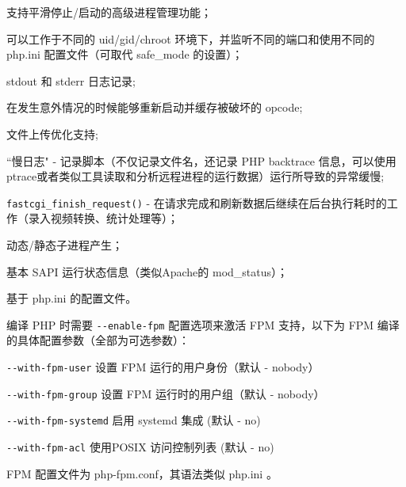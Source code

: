 \begin{compactitem}
\item 支持平滑停止/启动的高级进程管理功能；

\item 可以工作于不同的 uid/gid/chroot 环境下，并监听不同的端口和使用不同的 php.ini 配置文件（可取代 safe\_mode 的设置）；

\item stdout 和 stderr 日志记录;

\item 在发生意外情况的时候能够重新启动并缓存被破坏的 opcode;

\item 文件上传优化支持;

\item ``慢日志" - 记录脚本（不仅记录文件名，还记录 PHP backtrace 信息，可以使用 ptrace或者类似工具读取和分析远程进程的运行数据）运行所导致的异常缓慢;

\item \texttt{fastcgi\_finish\_request()} - 在请求完成和刷新数据后继续在后台执行耗时的工作（录入视频转换、统计处理等）；

\item 动态/静态子进程产生；

\item 基本 SAPI 运行状态信息（类似Apache的 mod\_status）；

\item 基于 php.ini 的配置文件。

\end{compactitem}

编译 PHP 时需要 \texttt{-\/-enable-fpm} 配置选项来激活 FPM 支持，以下为 FPM 编译的具体配置参数（全部为可选参数）：

\begin{compactitem}
\item \texttt{-\/-with-fpm-user} 设置 FPM 运行的用户身份（默认 - nobody）

\item \texttt{-\/-with-fpm-group} 设置 FPM 运行时的用户组（默认 - nobody）

\item \texttt{-\/-with-fpm-systemd} 启用 systemd 集成 (默认 - no)

\item \texttt{-\/-with-fpm-acl} 使用POSIX 访问控制列表 (默认 - no)
\end{compactitem}

FPM 配置文件为 php-fpm.conf，其语法类似 php.ini 。


